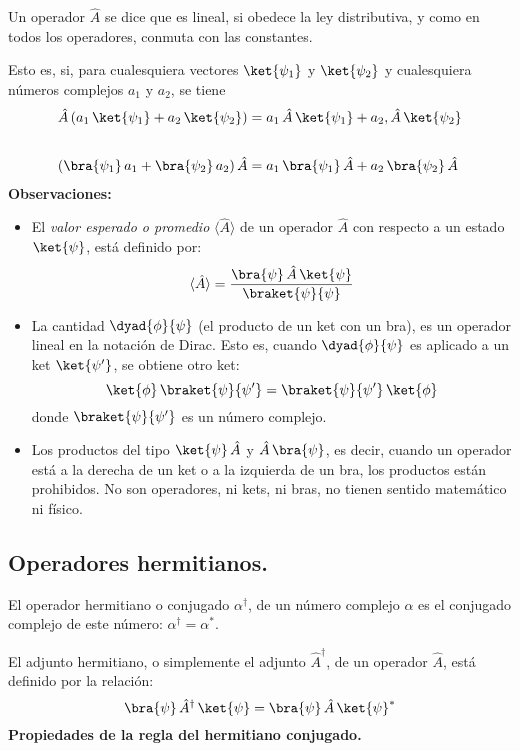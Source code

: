 Un operador $\hat{A}$ se dice que es lineal, si obedece la ley distributiva, y como en todos los operadores, conmuta con las constantes.
\par
Esto es, si, para cualesquiera vectores $\ket{\psi_{1}}$ y $\ket{\psi_{2}}$ y cualesquiera números complejos $a_{1}$ y $a_{2}$, se tiene
\begin{align}
\hat{A} \, (a_{1} \, \ket{\psi_{1}} + a_{2} \, \ket{\psi_{2}}) &= a_{1} \, \hat{A} \, \ket{\psi_{1}} + a_{2} , \hat{A} \, \ket{\psi_{2}} \label{eq:ecuacion_02_56} \\[1.75em]
( \bra{\psi_{1}} \, a_{1} +  \bra{\psi_{2}} \, a_{2}) \, \hat{A} &= a_{1} \, \bra{\psi_{1}} \, \hat{A} + a_{2} \, \bra{\psi_{2}} \, \hat{A} \label{eq:ecuacion_02_57}
\end{align}
\newpage
\textbf{Observaciones:}
\begin{itemize}
\item El \emph{valor esperado o promedio} $\langle{\hat{A}}\rangle$ de un operador $\hat{A}$ con respecto a un estado $\ket{\psi}$, está definido por:
\begin{equation}
\langle{\hat{A}}\rangle = \dfrac{\bra{\psi} \, \hat{A} \, \ket{\psi}}{\braket{\psi}{\psi}}
\label{eq:ecuacion_02_58}
\end{equation}
\item La cantidad $\dyad{\phi}{\psi}$ (el producto de un ket con un bra), es un operador lineal en la notación de Dirac. Esto es, cuando $\dyad{\phi}{\psi}$ es aplicado a un ket $\ket{\psi^{\prime}}$, se obtiene otro ket:
\begin{equation}
\ket{\phi} \, \braket{\psi}{\psi^{\prime}} =  \braket{\psi}{\psi^{\prime}} \, \ket{\phi}
\label{eq:ecuacion_02_59}
\end{equation}
donde $\braket{\psi}{\psi^{\prime}}$ es un número complejo.
\item Los productos del tipo $\ket{\psi} \, \hat{A}$ y $\hat{A} \, \bra{\psi}$, es decir, cuando un operador está a la derecha de un ket o a la izquierda de un bra, los productos están prohibidos. No son operadores, ni kets, ni bras, no tienen sentido matemático ni físico.
\end{itemize}
\subsection{Operadores hermitianos.}
El operador hermitiano o conjugado $\alpha^{\dagger}$, de un número complejo $\alpha$ es el conjugado complejo de este número: $\alpha^{\dagger} = \alpha^{*}$.
\par
El adjunto hermitiano, o simplemente el adjunto $\hat{A}^{\dagger}$, de un operador $\hat{A}$, está definido por la relación:
\begin{equation}
\bra{\psi} \, \hat{A}^{\dagger} \, \ket{\psi} = \bra{\psi} \, \hat{A} \, \ket{\psi}^{*}
\label{eq:ecuacion_02_60}
\end{equation}
\textbf{Propiedades de la regla del hermitiano conjugado.}

